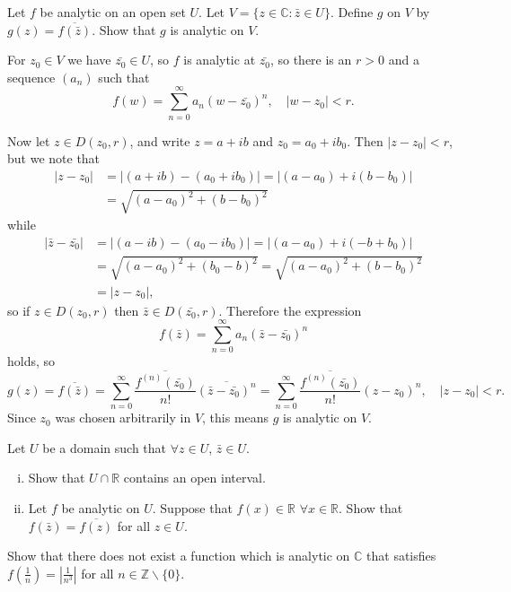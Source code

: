 \documentclass{article}
\newcounter{Problem}
\newenvironment{Problem}{\begin{Exercise}[name={Problem},
                                          counter={Problem}]}
                        {\end{Exercise}}
\begin{document}
\begin{Problem}
  Let $f$ be analytic on an open set $U$. Let
  $V = \{ z \in \mathbb{C} : \bar{z} \in U \}$. Define $g$ on $V$ by
  $g(z) = \overline{f(\bar{z})}$. Show that $g$ is analytic on $V$.
\end{Problem}

\begin{Answer}
For $z_0 \in V$ we have $\bar{z_0} \in U$, so
$f$ is analytic at $\bar{z_0}$, so there is an
$r > 0$ and a sequence $(a_n)$ such that
$$
  f(w)
= \sum_{n=0}^\infty a_n(w - \bar{z_0})^n, \quad
  |w - z_0| < r.
$$

Now let $z \in D(z_0, r)$, and write $z = a + ib$ and
$z_0 = a_0 + ib_0$. Then $|z - z_0| < r$, but we note that
\begin{align*}
  |z - z_0|
&= |(a + ib) - (a_0 + ib_0)|
 = |(a - a_0) + i(b - b_0)| \\
&= \sqrt{(a - a_0)^2 + (b - b_0)^2}
\end{align*}
while
\begin{align*}
  |\bar{z} - \bar{z_0}|
&= |(a - ib) - (a_0 - ib_0)|
 = |(a - a_0) + i(-b + b_0)| \\
&= \sqrt{(a - a_0)^2 + (b_0 - b)^2}
 = \sqrt{(a - a_0)^2 + (b - b_0)^2} \\
&= |z - z_0|,
\end{align*}
so if $z \in D(z_0, r)$ then $\bar{z} \in D(\bar{z_0}, r)$. Therefore
the expression
$$
f(\bar{z})
= \sum_{n=0}^\infty a_n (\bar{z} - \bar{z_0})^n
$$
holds, so
$$
  g(z)
= \overline{f(\bar{z})}
= \sum_{n=0}^\infty \frac{\overline{f^{(n)}(\bar{z_0})}}{n!}
                 \overline{(\bar{z} - \bar{z_0})^n}
= \sum_{n=0}^\infty \frac{\overline{f^{(n)}(\bar{z_0})}}{n!}
                 (z - z_0)^n, \quad
|z - z_0| < r.
$$
Since $z_0$ was chosen arbitrarily
in $V$, this means $g$ is analytic on $V$.
\end{Answer}

\begin{Problem}
  Let $U$ be a domain such that $\forall z \in U$, $\bar{z} \in U$.
  \begin{enumerate}[(i)]
    \item{
      Show that $U \cap \mathbb{R}$ contains an open interval.
    }
    \item{
      Let $f$ be analytic on $U$. Suppose that $f(x) \in \mathbb{R}$
      $\forall x \in \mathbb{R}$. Show that $f(\bar{z}) = \overline{f(z)}$
      for all $z \in U$.
    }
  \end{enumerate}
\end{Problem}

\begin{Problem}
  Show that there does not exist a function which is analytic on
  $\mathbb{C}$ that satisfies
  $f\left(\frac{1}{n}\right) = \left|\frac{1}{n^3}\right|$ for all
  $n \in \mathbb{Z} \backslash \{ 0 \}$.
\end{Problem}
\end{document}
